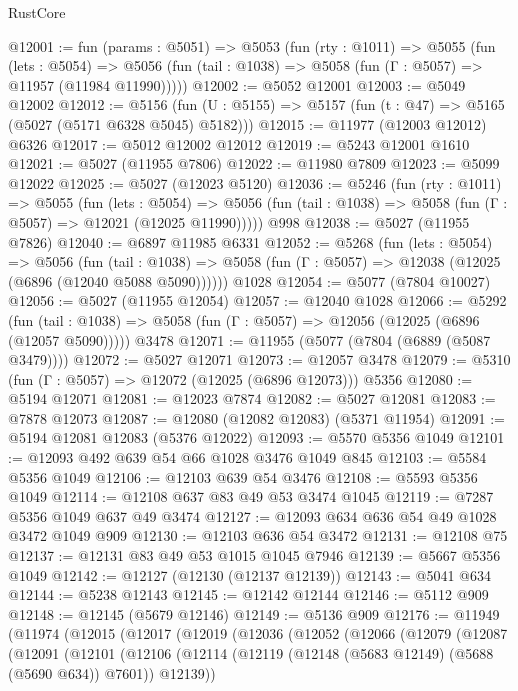 \begin{lexlean}{RustCore}
\begin{coremodule}
@12001 := fun (params : @5051) =>
  @5053
    (fun (rty : @1011) =>
    @5055
      (fun (lets : @5054) =>
      @5056 (fun (tail : @1038) => @5058 (fun (Γ : @5057) => @11957 (@11984 @11990)))))
@12002 := @5052 @12001
@12003 := @5049 @12002
@12012 := @5156
    (fun (U : @5155) => @5157 (fun (t : @47) => @5165 (@5027 (@5171 @6328 @5045) @5182)))
@12015 := @11977 (@12003 @12012) @6326
@12017 := @5012 @12002 @12012
@12019 := @5243 @12001 @1610
@12021 := @5027 (@11955 @7806)
@12022 := @11980 @7809
@12023 := @5099 @12022
@12025 := @5027 (@12023 @5120)
@12036 := @5246
    (fun (rty : @1011) =>
    @5055
      (fun (lets : @5054) =>
      @5056 (fun (tail : @1038) => @5058 (fun (Γ : @5057) => @12021 (@12025 @11990)))))
    @998
@12038 := @5027 (@11955 @7826)
@12040 := @6897 @11985 @6331
@12052 := @5268
    (fun (lets : @5054) =>
    @5056
      (fun (tail : @1038) =>
      @5058 (fun (Γ : @5057) => @12038 (@12025 (@6896 (@12040 @5088 @5090))))))
    @1028
@12054 := @5077 (@7804 @10027)
@12056 := @5027 (@11955 @12054)
@12057 := @12040 @1028
@12066 := @5292
    (fun (tail : @1038) => @5058 (fun (Γ : @5057) => @12056 (@12025 (@6896 (@12057 @5090)))))
    @3478
@12071 := @11955 (@5077 (@7804 (@6889 (@5087 @3479))))
@12072 := @5027 @12071
@12073 := @12057 @3478
@12079 := @5310 (fun (Γ : @5057) => @12072 (@12025 (@6896 @12073))) @5356
@12080 := @5194 @12071
@12081 := @12023 @7874
@12082 := @5027 @12081
@12083 := @7878 @12073
@12087 := @12080 (@12082 @12083) (@5371 @11954)
@12091 := @5194 @12081 @12083 (@5376 @12022)
@12093 := @5570 @5356 @1049
@12101 := @12093 @492 @639 @54 @66 @1028 @3476 @1049 @845
@12103 := @5584 @5356 @1049
@12106 := @12103 @639 @54 @3476
@12108 := @5593 @5356 @1049
@12114 := @12108 @637 @83 @49 @53 @3474 @1045
@12119 := @7287 @5356 @1049 @637 @49 @3474
@12127 := @12093 @634 @636 @54 @49 @1028 @3472 @1049 @909
@12130 := @12103 @636 @54 @3472
@12131 := @12108 @75
@12137 := @12131 @83 @49 @53 @1015 @1045 @7946
@12139 := @5667 @5356 @1049
@12142 := @12127 (@12130 (@12137 @12139))
@12143 := @5041 @634
@12144 := @5238 @12143
@12145 := @12142 @12144
@12146 := @5112 @909
@12148 := @12145 (@5679 @12146)
@12149 := @5136 @909
@12176 := @11949
    (@11974
      (@12015
        (@12017
          (@12019
            (@12036
              (@12052
                (@12066
                  (@12079
                    (@12087
                      (@12091
                        (@12101
                          (@12106
                            (@12114
                              (@12119 (@12148 (@5683 @12149) (@5688 (@5690 @634)) @7601))
                              @12139))

\end{coremodule}
\end{lexlean}
